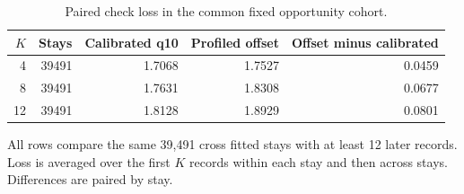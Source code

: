 \begin{table}[!htbp]
\caption{Paired check loss in the common fixed opportunity cohort.}
\label{tab:common_cohort_fixed_opportunity_check_loss}
\centering
\small
\begin{tabular}{rrrrr}
\hline
$K$ & Stays & Calibrated q10 & Profiled offset & Offset minus calibrated\\
\hline
4 & 39491 & 1.7068 & 1.7527 & 0.0459\\
8 & 39491 & 1.7631 & 1.8308 & 0.0677\\
12 & 39491 & 1.8128 & 1.8929 & 0.0801\\
\hline
\end{tabular}
\par\smallskip
\footnotesize{All rows compare the same 39,491 cross fitted stays with at least 12 later records. Loss is averaged over the first $K$ records within each stay and then across stays. Differences are paired by stay.}
\end{table}
